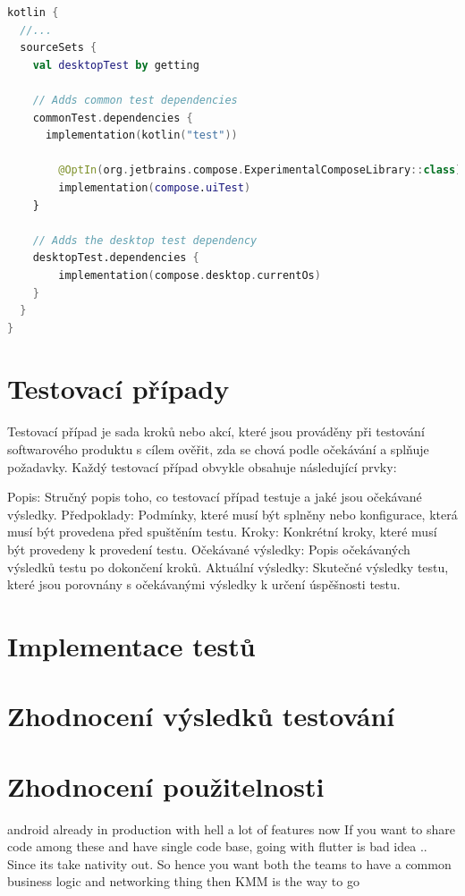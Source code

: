 \begin{lstlisting}[caption={Integrace testů Gradle}, label={lst:testsIntegration}, language=Kotlin]
kotlin {
  //...
  sourceSets {
    val desktopTest by getting

    // Adds common test dependencies
    commonTest.dependencies {
      implementation(kotlin("test"))

        @OptIn(org.jetbrains.compose.ExperimentalComposeLibrary::class)
        implementation(compose.uiTest)
    }

    // Adds the desktop test dependency
    desktopTest.dependencies {
        implementation(compose.desktop.currentOs)
    }
  }
}
\end{lstlisting}
\section{Testovací případy}
Testovací případ je sada kroků nebo akcí, které jsou prováděny při testování softwarového produktu s cílem ověřit, zda se chová podle očekávání a splňuje 
požadavky. Každý testovací případ obvykle obsahuje následující prvky:

Popis: Stručný popis toho, co testovací případ testuje a jaké jsou očekávané výsledky.
Předpoklady: Podmínky, které musí být splněny nebo konfigurace, která musí být provedena před spuštěním testu.
Kroky: Konkrétní kroky, které musí být provedeny k provedení testu.
Očekávané výsledky: Popis očekávaných výsledků testu po dokončení kroků.
Aktuální výsledky: Skutečné výsledky testu, které jsou porovnány s očekávanými výsledky k určení úspěšnosti testu.

\section{Implementace testů}
\section{Zhodnocení výsledků testování}

\section{Zhodnocení použitelnosti}

android already in production with hell a lot of features now If you want to share code among these and have single code base, going with flutter is bad idea .. Since its take nativity out. So hence you want both the teams to have a common business logic and networking thing then KMM is the way to go 

